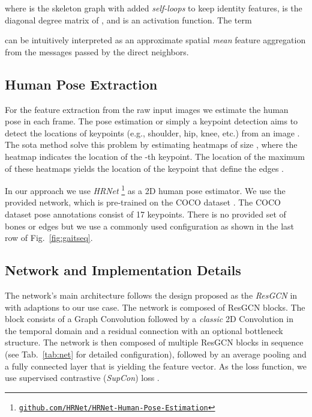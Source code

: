 \documentclass{article}
\begin{document}
where  is the skeleton graph with added \textit{self-loops} to keep identity features,  is the diagonal degree matrix of , and  is an activation function.
The term

can be intuitively interpreted as an approximate spatial \textit{mean} feature aggregation from the messages passed by the direct neighbors.

\subsection{Human Pose Extraction}
For the feature extraction from the raw input images we estimate the human pose in each frame.
The pose estimation or simply a keypoint detection aims to detect the locations of  keypoints (e.g., shoulder, hip, knee, etc.) from an image . The \gls{sota} method \cite{cheng2020bottom} solve this problem by estimating  heatmaps  of size , where the heatmap  indicates the location of the -th keypoint. The location of the maximum of these heatmaps  yields the location of the keypoint  that define the edges .

In our approach we use \textit{HRNet} \cite{sun2019deep}\footnote{\href{https://github.com/HRNet/HRNet-Human-Pose-Estimation}{\tt github.com/HRNet/HRNet-Human-Pose-Estimation}} as a 2D human pose estimator. We use the provided network, which is pre-trained  on the COCO dataset \cite{lin2014microsoft}. The COCO dataset pose annotations consist of 17 keypoints. There is no provided set of bones or edges  but we use a commonly used configuration as shown in the last row of Fig.~\ref{fig:gaitseq}. 

\subsection{Network and Implementation Details}
The network's main architecture follows the design proposed as the \textit{ResGCN} in \cite{song2020stronger} with adaptions to our use case. The network is composed of ResGCN blocks. The block consists of a Graph Convolution followed by a \textit{classic} 2D Convolution in the temporal domain and a residual connection with an optional bottleneck structure. The network is then composed of multiple ResGCN blocks in sequence (see Tab.~\ref{tab:net} for detailed configuration), followed by an average pooling and a fully connected layer that is yielding the feature vector. As the loss function, we use supervised contrastive (\textit{SupCon}) loss \cite{khosla2020supervised}.
\end{document}
